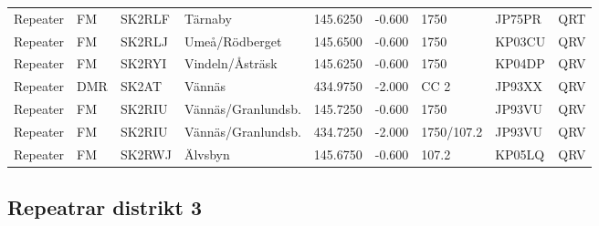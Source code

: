 \begin{longtable}{llllrrlll}
Repeater   & FM          & SK2RLF    & Tärnaby            & 145.6250     & -0.600     & 1750       & JP75PR      & QRT      \\
Repeater   & FM          & SK2RLJ    & Umeå/Rödberget     & 145.6500     & -0.600     & 1750       & KP03CU      & QRV      \\
Repeater   & FM          & SK2RYI    & Vindeln/Åsträsk    & 145.6250     & -0.600     & 1750       & KP04DP      & QRV      \\
Repeater   & DMR         & SK2AT     & Vännäs             & 434.9750     & -2.000     & CC 2       & JP93XX      & QRV      \\
Repeater   & FM          & SK2RIU    & Vännäs/Granlundsb. & 145.7250     & -0.600     & 1750       & JP93VU      & QRV      \\
Repeater   & FM          & SK2RIU    & Vännäs/Granlundsb. & 434.7250     & -2.000     & 1750/107.2 & JP93VU      & QRV      \\
Repeater   & FM          & SK2RWJ    & Älvsbyn            & 145.6750     & -0.600     & 107.2      & KP05LQ      & QRV      \\
\end{longtable}

\normalsize

\clearpage

\subsection{Repeatrar distrikt 3}

\scriptsize

